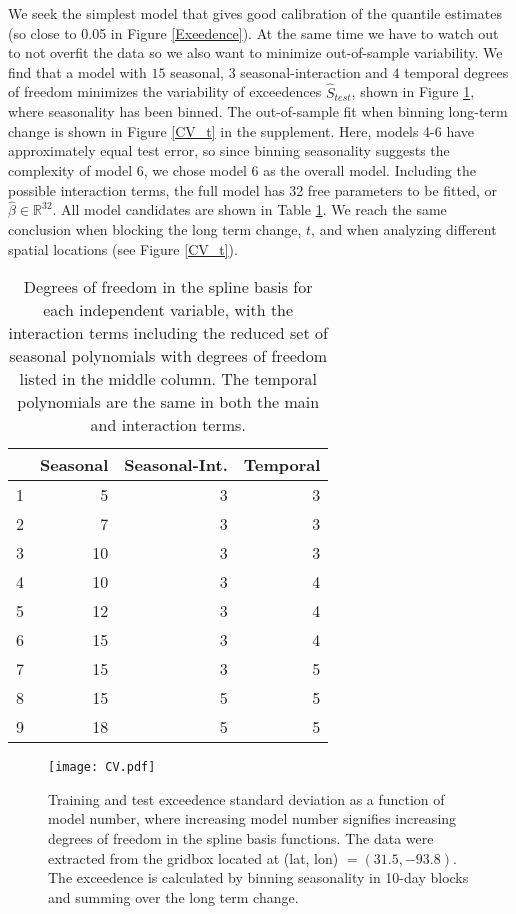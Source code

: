 \documentclass{ametsoc}
\newcommand\smallfigwidth{\columnwidth}
\begin{document}
We seek the simplest model that gives good calibration of the quantile estimates (so close to 0.05 in Figure \ref{Exeedence}). At the same time we have to watch out to not overfit the data so we also want to minimize out-of-sample variability. We find that a model with $15$ seasonal, $3$ seasonal-interaction and $4$ temporal degrees of freedom minimizes the variability of exceedences $\hat{S}_{test}$, shown in Figure \ref{CV}, where seasonality has been binned. The out-of-sample fit when binning long-term change is shown in Figure \ref{CV_t} in the supplement. Here, models 4-6 have approximately equal test error, so since binning seasonality suggests the complexity of model 6, we chose model 6 as the overall model. Including the possible interaction terms, the full model has 32 free parameters to be fitted, or $\hat{\beta} \in \mathbb{R}^{32}$. All model candidates are shown in Table \ref{tab:models}. We reach the same conclusion when blocking the long term change, $t$, and when analyzing different spatial locations (see Figure \ref{CV_t}).

\begin{table}[ht]
\centering
\begin{tabular}{rrrr}
  \hline
 & Seasonal & Seasonal-Int. & Temporal \\ 
  \hline
1 & 5 & 3 & 3 \\ 
  2 & 7 & 3 & 3 \\ 
  3 & 10 & 3 & 3 \\ 
  4 & 10 & 3 & 4 \\ 
  5 & 12 & 3 & 4 \\ 
  6 & 15 & 3 & 4 \\ 
  7 & 15 & 3 & 5 \\ 
  8 & 15 & 5 & 5 \\ 
  9 & 18 & 5 & 5 \\ 
   \hline
\end{tabular}
\caption{Degrees of freedom in the spline basis for each 
    independent variable, with the interaction terms including the reduced set of seasonal polynomials with degrees of freedom listed in the middle column. The temporal polynomials are the same in both the main and interaction terms.} 
\label{tab:models}
\end{table}

\begin{figure}[ht]
\centerline{\texttt{[image: CV.pdf]}}
\caption{\small{Training and test exceedence standard deviation as a function of model number, where increasing model number signifies increasing degrees of freedom in the spline basis functions. The data were extracted from the gridbox located at (lat, lon) $=(31.5, -93.8)$}. The exceedence is calculated by binning seasonality in 10-day blocks and summing over the long term change.}
\label{CV}
\end{figure}
\end{document}
